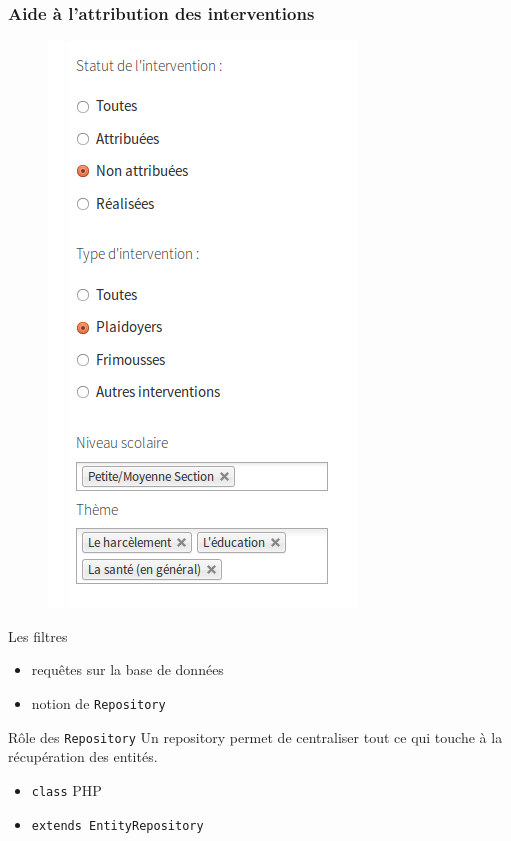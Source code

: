 \speaker{\Julie}

\begin{frame}
\frametitle{Aide à l'attribution des interventions}
	\begin{minipage}[c]{.40\linewidth}
      \begin{figure}[r]
		\includegraphics[scale=0.35]{images/filtreListeIntervention.png}
	  \end{figure}
   \end{minipage} \hfill
   \begin{minipage}[c]{.52\linewidth}
      \begin{block}{Les filtres}
		\begin{itemize}
			\item requêtes sur la base de données
			\item notion de \texttt{Repository}
		\end{itemize}
	  \end{block}
	  \begin{block}{Rôle des \texttt{Repository}}
		Un repository permet de centraliser tout ce qui touche à la récupération des entités.
		\begin{itemize}
		\item \texttt{class} PHP
		\item \texttt{extends EntityRepository}
		\end{itemize}
	  \end{block}
   \end{minipage} \hfill
\end{frame}

